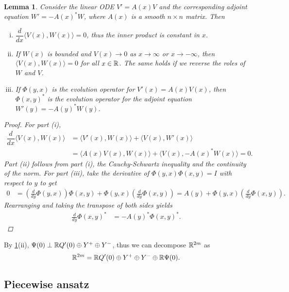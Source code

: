 \documentclass[12pt]{elsarticle}
\theoremstyle{plain}
\newtheorem{lemma}[theorem]{Lemma}
\theoremstyle{definition}
\theoremstyle{remark}
\numberwithin{theorem}{section}
\numberwithin{equation}{section}
\begin{document}
\begin{lemma}\label{eigadjoint}
Consider the linear ODE $V' = A(x)V$ and the corresponding adjoint equation $W' = -A(x)^* W$, where $A(x)$ is a smooth $n \times n$ matrix. Then
\begin{enumerate}[(i)]
\item $\dfrac{d}{dx}\langle V(x), W(x) \rangle = 0$, thus the inner product is constant in $x$.
\item If $W(x)$ is bounded and $V(x) \rightarrow 0$ as $x \rightarrow \infty$ or $x \rightarrow -\infty$, then $\langle V(x), W(x) \rangle = 0$ for all $x \in \mathbb{R}$. The same holds if we reverse the roles of $W$ and $V$.
\item If $\Phi(y, x)$ is the evolution operator for $V'(x) = A(x)V(x)$, then $\Phi(x, y)^*$ is the evolution operator for the adjoint equation $W'(y) = -A(y)^* W(y)$.
\end{enumerate}
\begin{proof}
For part (i), 
\begin{align*}
\dfrac{d}{dx}\langle V(x), W(x) \rangle &= 
\langle V'(x), W(x) \rangle + \langle V(x), W'(x) \rangle \\
&= \langle A(x)V(x), W(x) \rangle + \langle V(x), -A(x)^* W(x) \rangle = 0.
\end{align*}
Part (ii) follows from part (i), the Cauchy-Schwartz inequality and the continuity of the norm. For part (iii), take the derivative of $\Phi(y, x)\Phi(x, y) = I$ with respect to $y$ to get
\begin{align*}
0 &= \left(\frac{d}{dy}\Phi(y, x)\right) \Phi(x, y) +
\Phi(y, x)\left(\frac{d}{dy}\Phi(x, y)\right) 
= A(y) + \Phi(y, x)\left(\frac{d}{dy}\Phi(x, y)\right).
\end{align*}
Rearranging and taking the transpose of both sides yields
\begin{align*}
\frac{d}{dy}\Phi(x, y)^* &= -A(y)^* \Phi(x, y)^*.
\end{align*}
\end{proof}
\end{lemma}

\noi By \cref{eigadjoint}(ii), $\Psi(0) \perp \mathbb{R} Q'(0) \oplus Y^+ \oplus Y^-$, thus we can decompose $\mathbb{R}^{2m}$ as
\begin{equation}\label{R2mdecomp}
\mathbb{R}^{2m} = \mathbb{R} Q'(0) \oplus Y^+ \oplus Y^- \oplus \mathbb{R} \Psi(0).
\end{equation}

\subsection{Piecewise ansatz}
\end{document}
